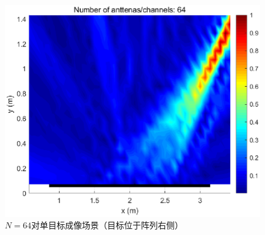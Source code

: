 \begin{figure}[H]
  \centering
  \includegraphics[width=.8\textwidth]{figures/exp/N64_right.eps}
  \caption{$N=64$对单目标成像场景（目标位于阵列右侧）}
  \label{右结果}
\end{figure}